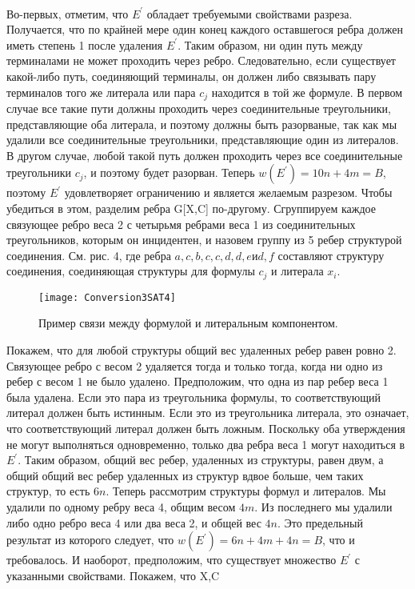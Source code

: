 \\Во-первых, отметим, что \(E^'\) обладает требуемыми свойствами разреза. Получается, что по крайней мере один конец каждого оставшегося ребра должен иметь степень 1 после удаления \(E^'\). Таким образом, ни один путь между терминалами не может проходить через ребро. Следовательно, если существует какой-либо путь, соединяющий терминалы, он должен либо связывать пару терминалов того же литерала или пара \(c_j\) находится в той же формуле. В первом случае все такие пути должны проходить через соединительные треугольники, представляющие оба литерала, и поэтому должны быть разорваные, так как мы удалили все соединительные треугольники, представляющие один из литералов. В другом случае, любой такой путь должен проходить через все соединительные треугольники \(c_j\), и поэтому будет разорван.
Теперь \(w(E^') = 10n + 4m = B\), поэтому \(E^'\) удовлетворяет ограничению и является желаемым разрезом. Чтобы убедиться в этом, разделим ребра G[X,C] по-другому. Сгруппируем каждое связующее ребро веса 2 с четырьмя ребрами веса 1 из соединительных треугольников, которым он инцидентен, и назовем группу из 5 ребер структурой соединения. См. рис. 4, где ребра \({a,c}, {b,c}, {c,d}, {d,e} и {d, f}\) составляют структуру соединения, соединяющая структуры для формулы \(c_j\) и литерала \(x_i\). 
\begin{figure}[hbt!]
\centering
    \texttt{[image: Conversion3SAT4]}
    \caption{Пример связи между формулой и литеральным компонентом.}
\end{figure}
Покажем, что для любой структуры общий вес удаленных ребер равен ровно 2. Связующее ребро с весом 2 удаляется тогда и только тогда, когда ни одно из ребер с весом 1 не было удалено. Предположим, что одна из пар ребер веса 1 была удалена. Если это пара из треугольника формулы, то соответствующий литерал должен быть истинным. Если это из треугольника литерала, это означает, что соответствующий литерал должен быть ложным. Поскольку оба утверждения не могут выполняться одновременно, только два ребра веса 1 могут находиться в \(E^'\). Таким образом, общий вес ребер, удаленных из структуры, равен двум, а общий общий вес ребер удаленных из структур вдвое больше, чем таких структур, то есть \(6n\). Теперь рассмотрим структуры формул и литералов. Мы удалили по одному ребру веса 4, общим весом \(4m\). Из последнего мы удалили либо одно ребро веса 4 или два веса 2, и общей вес \(4n\). Это предельный результат из которого следует, что
\(w(E^{'}) = 6n + 4m + 4n = B\), что и требовалось.
И наоборот, предположим, что существует множество \(E^'\) с указанными свойствами. Покажем, что X,C
